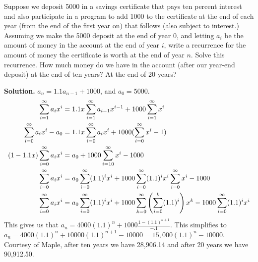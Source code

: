 \documentclass{book}
\begin{document}
\setcounter{project}{259}
\addtocounter{project}{-1}
\begin{activity}[]\label{activity-252}
\hypertarget{p-1408}{}%
Suppose we deposit \textdollar{}5000 in a savings certificate that pays ten percent interest and also participate in a program to add \textdollar{}1000 to the certificate at the end of each year (from the end of the first year on) that follows (also subject to interest.) Assuming we make the \textdollar{}5000 deposit at the end of year 0, and letting \(a_i\) be the amount of money in the account at the end of year \(i\), write a recurrence for the amount of money the certificate is worth at the end of year \(n\). Solve this recurrence. How much money do we have in the account (after our year-end deposit) at the end of ten years?  At the end of 20 years?%
\par\smallskip%
\noindent\textbf{Solution.}\hypertarget{solution-196}{}\quad%
\hypertarget{p-1409}{}%
\(a_n=1.1a_{n-1}+1000\), and \(a_0=5000\).%
\begin{align*}
\sum_{i=1}^\infty
a_ix^i &= 1.1x\sum_{i=1}^\infty a_{i-1}x^{i-1} + 1000\sum_{i=1}^\infty x^i\\
\sum_{i=0}^\infty a_ix^i -a_0 &=
1.1x\sum_{i=0}^\infty a_ix^i +1000(\sum_{i=0}^\infty x^i-1)\\
(1-1.1x)\sum_{i=0}^\infty a_ix^i  &=  a_0 +1000\sum_{i=10}^\infty x^i-1000\\
\sum_{i=0}^\infty a_i x^i &=  a_0\sum_{i=0}^\infty (1.1)^ix^i
+1000\sum_{i=0}^\infty (1.1)^ix^i\sum_{i=0}^\infty x^i -1000\\
\sum_{i=0}^\infty a_i x^i &=  a_0\sum_{i=0}^\infty (1.1)^ix^i
+1000\sum_{k=0}^\infty \left(\sum_{i=0}^k(1.1)^i\right)x^k
- 1000\sum_{i=0}^\infty (1.1)^ix^i
\end{align*}
This gives us that \(a_n= 4000(1.1)^n +1000 \frac{1-(1.1)^{n+1}}{-.1}\). This simplifies to \(a_n= 4000(1.1)^n+10000(1.1)^{n+1}-10000 = 15,000(1.1)^n-10000\). Courtesy of Maple, after ten years we have \textdollar{}28,906.14 and after 20 years we have \textdollar{}90,912.50.%
\end{activity}
\end{document}
